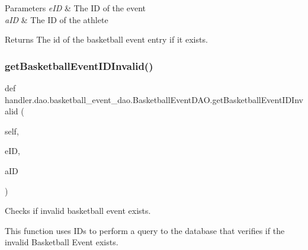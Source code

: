 \begin{DoxyParams}{Parameters}
{\em e\+ID} & The ID of the event \\
\hline
{\em a\+ID} & The ID of the athlete\\
\hline
\end{DoxyParams}
\begin{DoxyReturn}{Returns}
The id of the basketball event entry if it exists. 
\end{DoxyReturn}
\mbox{\label{classhandler_1_1dao_1_1basketball__event__dao_1_1_basketball_event_d_a_o_a7f99ad79343a2952df00c0ad3b3674be}} 
\subsubsection{\texorpdfstring{get\+Basketball\+Event\+I\+D\+Invalid()}{getBasketballEventIDInvalid()}}
{\footnotesize\ttfamily def handler.\+dao.\+basketball\+\_\+event\+\_\+dao.\+Basketball\+Event\+D\+A\+O.\+get\+Basketball\+Event\+I\+D\+Invalid (\begin{DoxyParamCaption}\item[{}]{self,  }\item[{}]{e\+ID,  }\item[{}]{a\+ID }\end{DoxyParamCaption})}



Checks if invalid basketball event exists. 

This function uses I\+Ds to perform a query to the database that verifies if the invalid Basketball Event exists.


